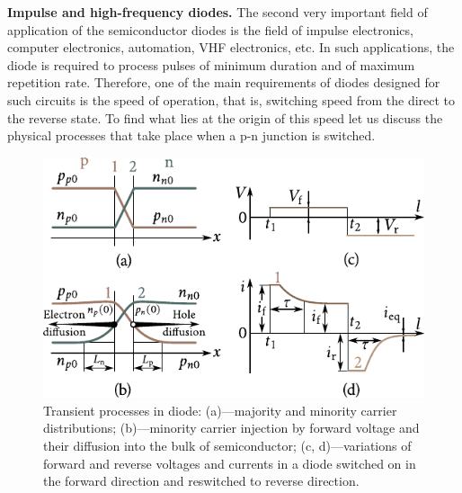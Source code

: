 \textbf{Impulse and high-frequency diodes.} The second very important field of application of the semiconductor diodes is the field of impulse electronics, computer electronics, automation, VHF electronics, etc. In such applications, the diode is required to process pulses of minimum duration and of maximum repetition rate. Therefore, one of the main requirements of diodes designed for such circuits is the speed of operation, that is, switching speed from the direct to the reverse state. To find what lies at the origin of this speed let us discuss the physical processes that take place when a p-n junction is switched.

\begin{figure}[t]
	\begin{center}
		\includegraphics[scale=1.0]{figures/ch_08/fig_8_18.pdf}
		\caption[]{Transient processes in diode: (a)---majority and minority carrier distributions; (b)---minority carrier injection by forward voltage and their diffusion into the bulk of semiconductor; (c, d)---variations of forward and reverse voltages and currents in a diode switched on in the forward direction and reswitched to reverse direction.}
		\label{fig:8_18}
	\end{center}
	\vspace{-0.8cm}
\end{figure}

